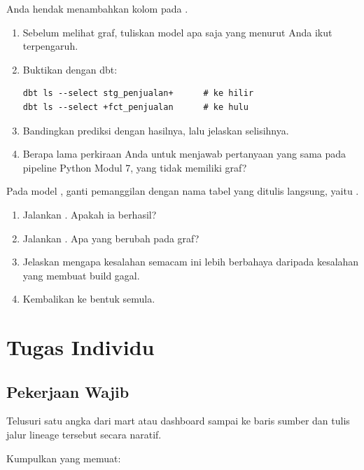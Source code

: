 
Anda hendak menambahkan kolom  pada .

\begin{enumerate}[leftmargin=1.4em]
  \item Sebelum melihat graf, tuliskan model apa saja yang menurut Anda ikut
        terpengaruh.
  \item Buktikan dengan dbt:
\begin{lstlisting}[style=shellgaya]
dbt ls --select stg_penjualan+      # ke hilir
dbt ls --select +fct_penjualan      # ke hulu
\end{lstlisting}
  \item Bandingkan prediksi dengan hasilnya, lalu jelaskan selisihnya.
  \item Berapa lama perkiraan Anda untuk menjawab pertanyaan yang sama pada
        pipeline Python Modul 7, yang tidak memiliki graf?
\end{enumerate}


Pada model , ganti pemanggilan
 dengan nama tabel yang ditulis langsung, yaitu
.

\begin{enumerate}[leftmargin=1.4em]
  \item Jalankan . Apakah ia berhasil?
  \item Jalankan . Apa yang berubah pada graf?
  \item Jelaskan mengapa kesalahan semacam ini lebih berbahaya daripada
        kesalahan yang membuat build gagal.
  \item Kembalikan ke bentuk semula.
\end{enumerate}

\section{Tugas Individu}

\subsection{Pekerjaan Wajib}
Telusuri satu angka dari mart atau dashboard sampai ke baris sumber dan tulis
jalur lineage tersebut secara naratif.

Kumpulkan  yang memuat:

